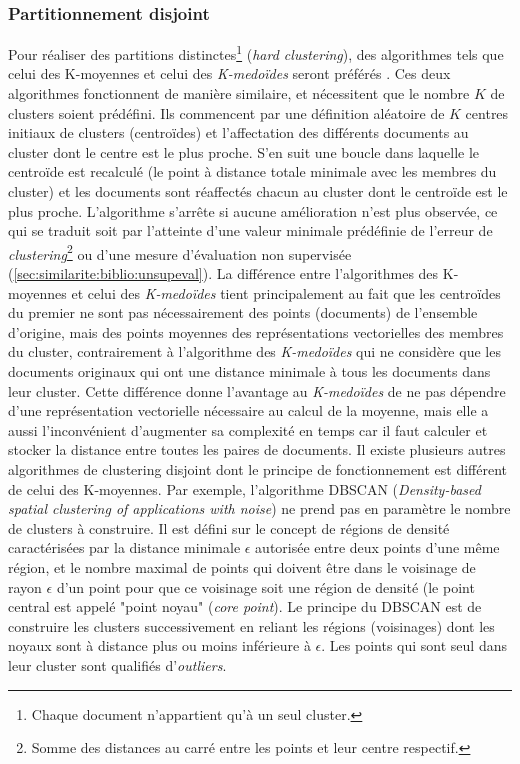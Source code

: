\subsubsection{Partitionnement disjoint}
Pour réaliser des partitions distinctes\footnote{Chaque document n'appartient qu'à un seul cluster.} (\textit{hard clustering}), des algorithmes tels que celui des K-moyennes \citep{forgey1965kmeans} et celui des \textit{K-medoïdes} \citep{kaufman1987kmedoids} seront préférés \citep{balabantaray2015kmeanskmedoids}. Ces deux algorithmes fonctionnent de manière similaire, et nécessitent que le nombre $K$ de clusters soient prédéfini. Ils commencent par une définition aléatoire de $K$ centres initiaux de clusters (centroïdes) et l'affectation des différents documents au cluster dont le centre est le plus proche. S'en suit une boucle dans laquelle le centroïde est recalculé (le point à distance totale minimale avec les membres du cluster) et les documents sont réaffectés chacun au cluster dont le centroïde est le plus proche. L'algorithme s'arrête si aucune amélioration n'est plus observée, ce qui se traduit soit par l'atteinte d'une valeur minimale prédéfinie de l'erreur de \textit{clustering}\footnote{Somme des distances au carré entre les points et leur centre respectif.} ou d'une mesure d'évaluation non supervisée (\ref{sec:similarite:biblio:unsupeval}). La différence entre l'algorithmes des K-moyennes et celui des \textit{K-medoïdes} tient principalement au fait que les centroïdes du premier ne sont pas nécessairement des points (documents) de l'ensemble d'origine, mais des points moyennes des représentations vectorielles des membres du cluster, contrairement à l'algorithme des \textit{K-medoïdes} qui ne considère que les documents originaux qui ont une distance minimale à tous les documents dans leur cluster. Cette différence donne l'avantage au \textit{K-medoïdes} de ne pas dépendre d'une représentation vectorielle nécessaire au calcul de la moyenne, mais elle a aussi l'inconvénient d'augmenter sa complexité en temps  car il faut calculer et stocker la distance entre toutes les paires de documents. Il existe plusieurs autres algorithmes de clustering disjoint dont le principe de fonctionnement est différent de celui des K-moyennes. Par exemple, l'algorithme DBSCAN (\textit{Density-based spatial clustering of applications with noise}) \citep{ester1996dbscan}  ne prend pas en paramètre le nombre de clusters à construire. Il est défini sur le concept de régions de densité caractérisées par la distance minimale $\epsilon$ autorisée entre deux points d'une même région, et le nombre maximal de points qui doivent être dans le voisinage de rayon $\epsilon$ d'un point pour que ce voisinage soit une région de densité (le point central est appelé "point noyau" (\textit{core point}). Le principe du DBSCAN est de construire les clusters successivement en reliant les régions (voisinages) dont les noyaux sont à distance plus ou moins inférieure à $\epsilon$. Les points qui sont seul dans leur cluster sont qualifiés d'\textit{outliers}. 
